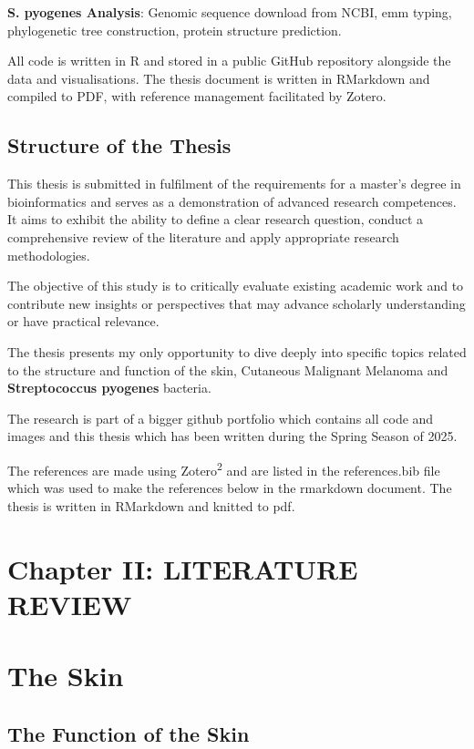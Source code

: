 \documentclass[
]{article}
\begin{document}
\textbf{S. pyogenes Analysis}: Genomic sequence download from NCBI, emm
typing, phylogenetic tree construction, protein structure prediction.

All code is written in R and stored in a public GitHub repository
alongside the data and visualisations. The thesis document is written in
RMarkdown and compiled to PDF, with reference management facilitated by
Zotero.

\subsection{Structure of the Thesis}\label{structure-of-the-thesis}

This thesis is submitted in fulfilment of the requirements for a
master's degree in bioinformatics and serves as a demonstration of
advanced research competences. It aims to exhibit the ability to define
a clear research question, conduct a comprehensive review of the
literature and apply appropriate research methodologies.

The objective of this study is to critically evaluate existing academic
work and to contribute new insights or perspectives that may advance
scholarly understanding or have practical relevance.

The thesis presents my only opportunity to dive deeply into specific
topics related to the structure and function of the skin, Cutaneous
Malignant Melanoma and \textbf{Streptococcus pyogenes} bacteria.

The research is part of a bigger github portfolio which contains all
code and images and this thesis which has been written during the Spring
Season of 2025.

The references are made using Zotero\textsuperscript{2} and are listed
in the references.bib file which was used to make the references below
in the rmarkdown document. The thesis is written in RMarkdown and
knitted to pdf.

\newpage

\section{Chapter II: LITERATURE
REVIEW}\label{chapter-ii-literature-review}

\section{The Skin}\label{the-skin}

\subsection{The Function of the Skin}\label{the-function-of-the-skin}
\end{document}
